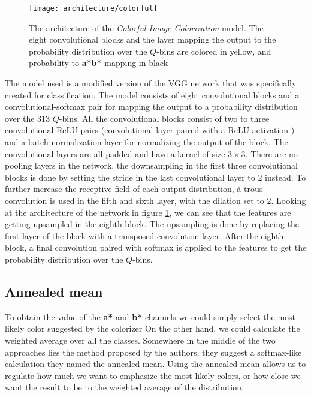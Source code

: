 \begin{figure}[!h]
	\centering
	\texttt{[image: architecture/colorful]}
    \caption{The architecture of the \textit{Colorful Image Colorization} model. 
	The eight convolutional blocks and the layer mapping the output to the probability 
	distribution over the $Q$-bins are colored in yellow, and probability to \textbf{a*b*}
	mapping in black}
	\label{fig:architecture_colorful}
\end{figure}

The model used is a modified version of the VGG \citep{simonyan2015vgg} network 
that was specifically created for classification. The model consists of eight
convolutional blocks and a convolutional-softmax pair for mapping the output to a
probability distribution over the 313 $Q$-bins.	All the convolutional blocks
consist of two to three convolutional-ReLU pairs (convolutional layer
paired with a ReLU activation \citep{abien2018relu}) and a batch normalization layer 
\citep{ioffe2015batchnorm} for normalizing the output of the block. 
The convolutional layers are all padded and have a kernel of size $3\times3$. There are 
no pooling layers in the network, the downsampling in the first three convolutional blocks 
is done by setting the stride in the last convolutional layer to $2$ instead.
To further increase the receptive field of each output distribution, à trous convolution
\citep{yu2016atrous} is used in the fifth and sixth layer, with the dilation set to $2$. 
Looking at the architecture of the network in figure \ref{fig:architecture_colorful},
we can see that the features are getting upsampled in the eighth block. The upsampling
is done by replacing the first layer of the block with a transposed convolution layer.
After the eighth block, a final convolution paired with softmax is applied to the 
features to get the probability distribution over the $Q$-bins. 

\subsection{Annealed mean}

To obtain the value of the \textbf{a*} and \textbf{b*} channels we could 
simply select the most likely color suggested by the colorizer On 
the other hand, we could calculate the weighted average over all the classes.
Somewhere in the middle of the two approaches lies the method proposed by 
the authors, they suggest a softmax-like calculation they named the annealed mean.
Using the annealed mean allows us to regulate how much we want to emphasize the 
most likely colors, or how close we want the result to be to the weighted 
average of the distribution.

